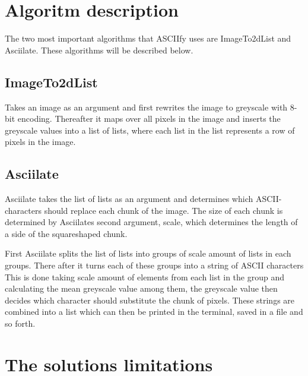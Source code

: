 \documentclass[12pt, a4paper]{article}
\begin{document}
			


	\section{Algoritm description}

	The two most important algorithms that ASCIIfy uses are ImageTo2dList and Asciilate. These algorithms will be described below.
		
		\subsection{ImageTo2dList}

		Takes an image as an argument and first rewrites the image to greyscale with 8-bit encoding. Thereafter it maps over all pixels in the image and inserts the greyscale values into a list of lists, where each list in the list represents a row of pixels in the image. 
			
		\subsection{Asciilate}	

		Asciilate takes the list of lists as an argument and determines which ASCII-characters should replace each chunk of the image. The size of each chunk is determined by Asciilates second argument, scale, which determines the length of a side of the squareshaped chunk.

		First Asciilate splits the list of lists into groups of scale amount of lists in each groups. There after it turns each of these groups into a string of ASCII characters This is done taking scale amount of elements from each list in the group and calculating the mean greyscale value among them, the greyscale value then decides which character should substitute the chunk of pixels. These strings are combined into a list which can then be printed in the terminal, saved in a file and so forth.
	
	\section{The solutions limitations}
	
\end{document}
